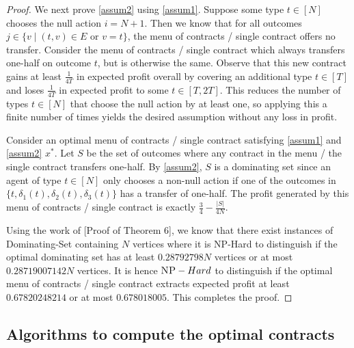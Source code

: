 \documentclass{article}
\newcommand{\DSet}{\textnormal{Dominating-Set}\xspace}
\newcommand{\NPHard}{\textsc{NP}-Hard\xspace}
\newcommand{\neighbor}[2]{\delta_{#1}\left(#2\right)}%
\begin{document}
\begin{proof}
We next prove \cref{assum2} using \cref{assum1}. Suppose some type $t \in [N]$ chooses the null action $i = N + 1$. Then we know that for all outcomes $j \in \{ v \mid (t,v) \in E \text{ or } v = t \} $, the menu of contracts / single contract offers no transfer. Consider the menu of contracts / single contract which always transfers one-half on outcome $t$, but is otherwise the same. Observe that this new contract gains at least $\frac{1}{4T}$ in expected profit overall by covering an additional type $t \in [T]$ and loses $\frac{1}{4T}$ in expected profit to some $t \in [T, 2T]$. This reduces the number of types $t \in [N]$ that choose the null action by at least one, so applying this a finite number of times yields the desired assumption without any loss in profit.

Consider an optimal menu of contracts / single contract satisfying \cref{assum1} and \cref{assum2} $x^*$. Let $S$ be the set of outcomes where any contract in the menu / the single contract transfers one-half. By \cref{assum2}, $S$ is a dominating set since an agent of type $t \in [N]$ only chooses a non-null action if one of the outcomes in $\{t, \neighbor{1}{t}, \neighbor{2}{t}, \neighbor{3}{t}\}$ has a transfer of one-half. The profit generated by this menu of contracts / single contract is exactly $\frac34 -  \frac{|S|}{4N}$.

Using the work of \cite{chlebik2008approximation}[Proof of Theorem 6], we know that there exist instances of \DSet containing $N$ vertices where it is \NPHard to distinguish if the optimal dominating set has at least $0.28792798 N$ vertices or at most $0.28719007142 N$ vertices. It is hence $\NPHard$ to distinguish if the optimal menu of contracts / single contract extracts expected profit at least $0.67820248214$ or at most $0.678018005$. This completes the proof.
\end{proof}


\subsection{Algorithms to compute the optimal contracts}

\expalg*
\end{document}

